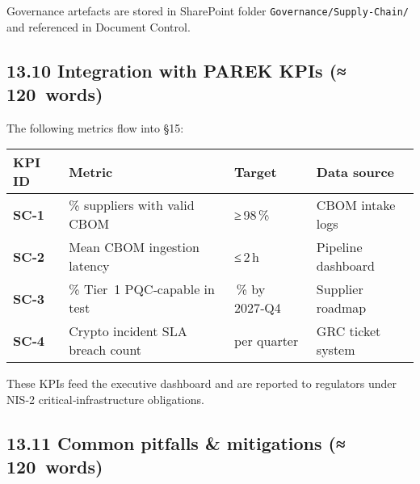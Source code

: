 \documentclass[
  english,
]{article}
\begin{document}
Governance artefacts are stored in SharePoint folder
\texttt{Governance/Supply‑Chain/} and referenced in Document Control.

\subsection{13.10 Integration with PAREK KPIs
(≈\,120~words)}\label{integration-with-parek-kpis-120-words}

The following metrics flow into §15:

\begin{longtable}[]{@{}
  >{\raggedright\arraybackslash}p{}
  >{\raggedright\arraybackslash}p{}
  >{\raggedright\arraybackslash}p{}
  >{\raggedright\arraybackslash}p{}@{}}
\toprule\noalign{}
\begin{minipage}[b]{\linewidth}\raggedright
KPI ID
\end{minipage} & \begin{minipage}[b]{\linewidth}\raggedright
Metric
\end{minipage} & \begin{minipage}[b]{\linewidth}\raggedright
Target
\end{minipage} & \begin{minipage}[b]{\linewidth}\raggedright
Data source
\end{minipage} \\
\midrule\noalign{}
\endhead
\bottomrule\noalign{}
\endlastfoot
\textbf{SC‑1} & \% suppliers with valid CBOM & ≥\,98\,\% & CBOM intake
logs \\
\textbf{SC‑2} & Mean CBOM ingestion latency & ≤\,2\,h & Pipeline
dashboard \\
\textbf{SC‑3} & \% Tier~1 PQC‑capable in test & 100\,\% by 2027‑Q4 &
Supplier roadmap \\
\textbf{SC‑4} & Crypto incident SLA breach count & 0 per quarter & GRC
ticket system \\
\end{longtable}

These KPIs feed the executive dashboard and are reported to regulators
under NIS‑2 critical‑infrastructure obligations.

\subsection{13.11 Common pitfalls \& mitigations
(≈\,120~words)}\label{common-pitfalls-mitigations-120-words-1}
\end{document}
